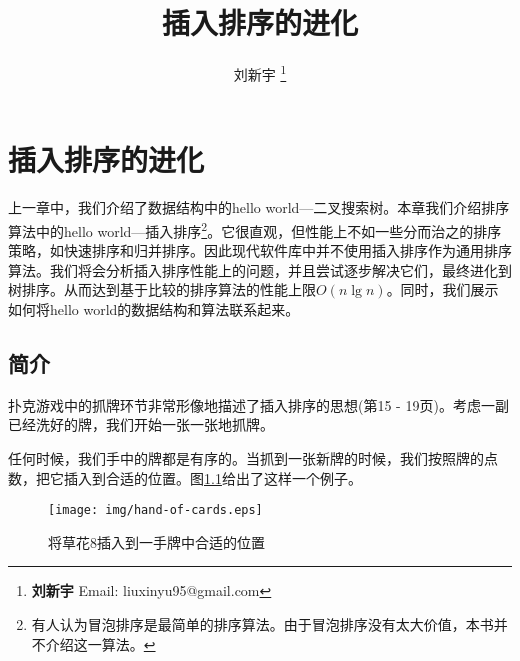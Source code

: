 \documentclass{ctexart}
\begin{document}


\title{插入排序的进化}

\author{刘新宇
\thanks{{\bfseries 刘新宇} \newline
  Email: liuxinyu95@gmail.com \newline}
  }

\maketitle
\fi


\ifx\wholebook\relax
\chapter{插入排序的进化}
\fi

上一章中，我们介绍了数据结构中的hello world—二叉搜索树。本章我们介绍排序算法中的hello world—插入排序\footnote{有人认为冒泡排序是最简单的排序算法。由于冒泡排序没有太大价值，本书并不介绍这一算法\cite{wiki-bubble-sort}。}。它很直观，但性能上不如一些分而治之的排序策略，如快速排序和归并排序。因此现代软件库中并不使用插入排序作为通用排序算法。我们将会分析插入排序性能上的问题，并且尝试逐步解决它们，最终进化到树排序。从而达到基于比较的排序算法的性能上限$O(n \lg n)$。同时，我们展示如何将hello world的数据结构和算法联系起来。

\section{简介}
\label{introduction} 
扑克游戏中的抓牌环节非常形像地描述了插入排序的思想(\cite{CLRS}第15 - 19页)。考虑一副已经洗好的牌，我们开始一张一张地抓牌。

任何时候，我们手中的牌都是有序的。当抓到一张新牌的时候，我们按照牌的点数，把它插入到合适的位置。图\ref{fig:hand-of-cards}给出了这样一个例子。

\begin{figure}[htbp]
  \centering
  \texttt{[image: img/hand-of-cards.eps]}
  \caption{将草花8插入到一手牌中合适的位置}
  \label{fig:hand-of-cards}
\end{figure}
\end{document}
